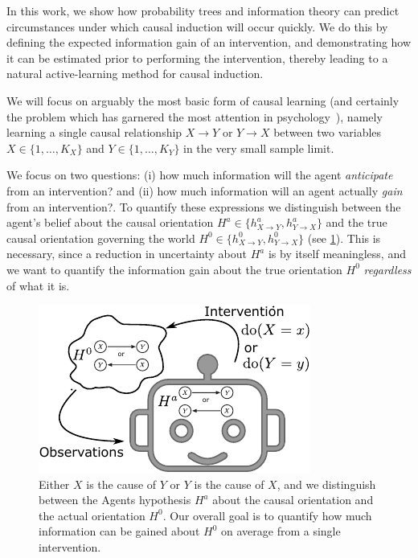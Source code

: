 \documentclass[letterpaper]{article} %
\begin{document}
In this work, we show how probability trees and information theory can predict circumstances under which causal induction will occur quickly. We do this by defining the expected information gain of an intervention, and demonstrating how it can be estimated prior to performing the intervention, thereby leading to a natural active-learning method for causal induction.

We will focus on arguably the most basic form of causal learning (and certainly the problem which has garnered the most attention in psychology~\cite{gopnik2001causal}), namely learning a single causal relationship $X \rightarrow Y$ or $Y \rightarrow X$ between two variables $X \in \{1,\dots,K_X\}$ and $Y \in \{1,\dots,K_Y\}$ in the very small sample limit.

We focus on two questions: (i) how much information will the agent \emph{anticipate} from an intervention? and (ii) how much information will an agent actually \emph{gain} from an intervention?. To quantify these expressions we distinguish between the agent's belief about the causal orientation $H^a \in \{h^a_{X \rightarrow Y}, h^a_{Y \rightarrow X}\}$ and the true causal orientation governing the world $H^0 \in \{h^0_{X \rightarrow Y}, h^0_{Y \rightarrow X} \}$ (see \cref{fig1svg}). This is necessary, since a reduction in uncertainty about $H^a$ is by itself meaningless, and we want to quantify the information gain about the true orientation $H^0$ \emph{regardless} of what it is.

\begin{figure}[t!]
\centering
\includegraphics[width=.75\linewidth]{fig1svg-crop}
\caption{Either $X$ is the cause of $Y$ or $Y$ is the cause of $X$, and we distinguish between the Agents hypothesis $H^a$ about the causal orientation and the actual orientation $H^0$. Our overall goal is to quantify how much information can be gained about $H^0$ on average from a single intervention.}\label{fig1svg}
\end{figure}
\end{document}
